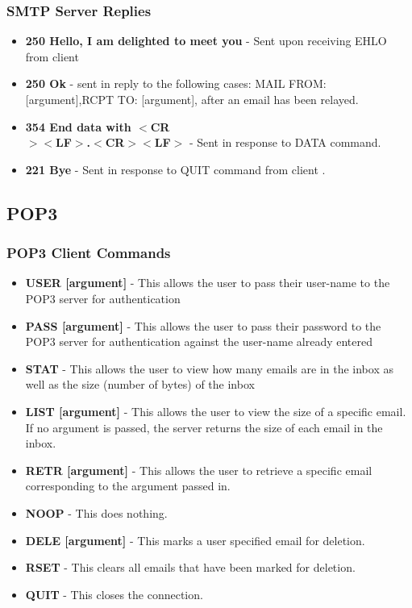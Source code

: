 \documentclass[11pt]{article}
\begin{document}
\begin{multicols}{2}
\subsubsection{SMTP Server Replies}
\begin{itemize}
  \item \textbf{250 Hello, I am delighted to meet you} - Sent upon receiving EHLO from client 
  \item \textbf{250 Ok} - sent in reply to the following cases: MAIL FROM: [argument],RCPT TO: [argument], after an email has been relayed.
  \item \textbf{354 End data with $<$CR
  \\$>$$<$LF$>$.$<$CR$>$$<$LF$>$} - Sent in response to DATA command. 	
  \item \textbf{221 Bye} - Sent in response to QUIT command from client \cite{SMTP}. 
\end{itemize}
\subsection{POP3}
\subsubsection{POP3 Client Commands}
\begin{itemize}
  \item \textbf{USER [argument]} - This allows the user to pass their user-name to the POP3 server for authentication
  \item \textbf{PASS [argument]} - This allows the user to pass their password to the POP3 server for authentication against the user-name already entered
  \item \textbf{STAT} - This allows the user to view how many emails are in the inbox as well as the size (number of bytes) of the inbox
  \item \textbf{LIST [argument]} - This allows the user to view the size of a specific email. If no argument is passed, the server returns the size of each email in the inbox.
  \item \textbf{RETR [argument]} - This allows the user to retrieve a specific email corresponding to the argument passed in.
  \item \textbf{NOOP} - This does nothing.
  \item \textbf{DELE [argument]} - This marks a user specified email for deletion.
  \item \textbf{RSET} - This clears all emails that have been marked for deletion.
  \item \textbf{QUIT} - This closes the connection.
\end{itemize}

\end{multicols}
\end{document}
